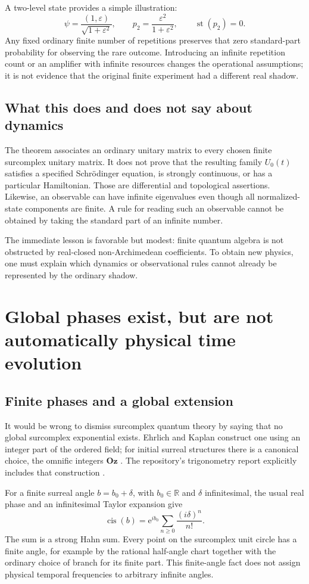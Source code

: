 \documentclass[11pt,a4paper]{article}
\numberwithin{equation}{section}
\theoremstyle{definition}
\theoremstyle{remark}
\newcommand{\R}{\mathbb R}
\newcommand{\st}{\operatorname{st}}
\newcommand{\Oz}{\mathbf{Oz}}
\newcommand{\ee}{\mathrm e}
\begin{document}
A two-level state provides a simple illustration:
\[
\psi=\frac{(1,\varepsilon)}{\sqrt{1+\varepsilon^2}},
\qquad p_2=\frac{\varepsilon^2}{1+\varepsilon^2},\qquad \st(p_2)=0.
\]
Any fixed ordinary finite number of repetitions preserves that zero
standard-part probability for observing the rare outcome. Introducing an
infinite repetition count or an amplifier with infinite resources changes the
operational assumptions; it is not evidence that the original finite
experiment had a different real shadow.

\subsection{What this does and does not say about dynamics}
The theorem associates an ordinary unitary matrix to every chosen finite
surcomplex unitary matrix. It does not prove that the resulting family $U_0(t)$
satisfies a specified Schr\"odinger equation, is strongly continuous, or has a
particular Hamiltonian. Those are differential and topological assertions.
Likewise, an observable can have infinite eigenvalues even though all
normalized-state components are finite. A rule for reading such an observable
cannot be obtained by taking the standard part of an infinite number.

The immediate lesson is favorable but modest: finite quantum algebra is not
obstructed by real-closed non-Archimedean coefficients. To obtain new physics,
one must explain which dynamics or observational rules cannot already be
represented by the ordinary shadow.

\section{Global phases exist, but are not automatically physical time evolution}\label{sec:phases}

\subsection{Finite phases and a global extension}
It would be wrong to dismiss surcomplex quantum theory by saying that no global
surcomplex exponential exists. Ehrlich and Kaplan construct one using an
integer part of the ordered field; for initial surreal structures there is a
canonical choice, the omnific integers $\Oz$ \cite{EK}. The repository's
trigonometry report explicitly includes that construction \cite{RepoTrig}.

For a finite surreal angle $b=b_0+\delta$, with $b_0\in\R$ and
$\delta$ infinitesimal, the usual real phase and an infinitesimal Taylor
expansion give
\[
\operatorname{cis}(b)
 =\ee^{ib_0}\sum_{n\ge0}\frac{(i\delta)^n}{n!}.
\]
The sum is a strong Hahn sum. Every point on the surcomplex unit circle has a
finite angle, for example by the rational half-angle chart together with the
ordinary choice of branch for its finite part. This finite-angle fact does not
assign physical temporal frequencies to arbitrary infinite angles.
\end{document}
